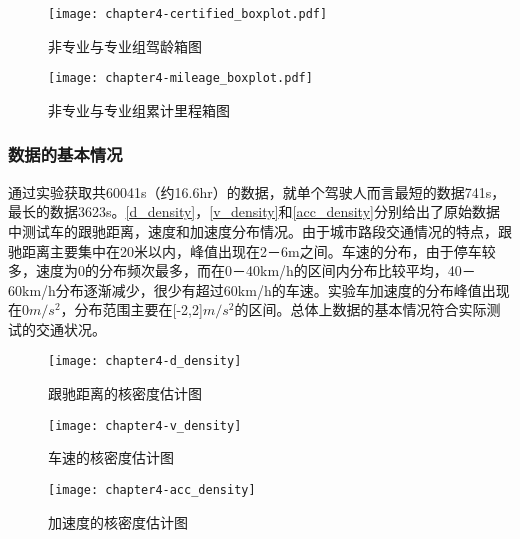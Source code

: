 \begin{figure}
\begin{minipage}[t]{0.48\linewidth}
\centering
\texttt{[image: chapter4-certified\_boxplot.pdf]}
\caption{非专业与专业组驾龄箱图}
\label{certified_boxplot}
\end{minipage}%
\hspace*{0.04\linewidth}
\begin{minipage}[t]{0.48\linewidth}
\centering
\texttt{[image: chapter4-mileage\_boxplot.pdf]}
\caption{非专业与专业组累计里程箱图}
\label{mileage_boxplot}
\end{minipage}
\end{figure}




\subsubsection{数据的基本情况}

通过实验获取共60041s（约16.6hr）的数据，就单个驾驶人而言最短的数据741s，最长的数据3623s。\autoref{d_density}，\autoref{v_density}和\autoref{acc_density}分别给出了原始数据中测试车的跟驰距离，速度和加速度分布情况。由于城市路段交通情况的特点，跟驰距离主要集中在20米以内，峰值出现在2－6m之间。车速的分布，由于停车较多，速度为0的分布频次最多，而在0－40km/h的区间内分布比较平均，40－60km/h分布逐渐减少，很少有超过60km/h的车速。实验车加速度的分布峰值出现在0$m/s^2$，分布范围主要在[-2,2]$m/s^2$的区间。总体上数据的基本情况符合实际测试的交通状况。





\begin{figure}[htbp]
\begin{minipage}[t]{0.3\linewidth}
\centering
\texttt{[image: chapter4-d\_density]}
\caption{跟驰距离的核密度估计图}
\label{d_density}
\end{minipage}%
\hspace*{0.05\linewidth}
\begin{minipage}[t]{0.3\linewidth}
\centering
\texttt{[image: chapter4-v\_density]}
\caption{车速的核密度估计图}
\label{v_density}
\end{minipage}
\hspace*{0.05\linewidth}
\centering
\texttt{[image: chapter4-acc\_density]}
\caption{加速度的核密度估计图}
\label{acc_density}
\end{figure}







